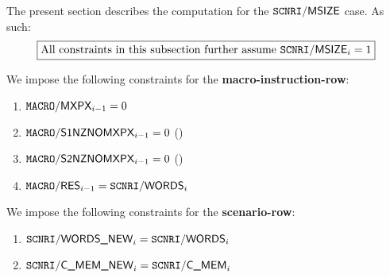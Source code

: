 

The present section describes the computation for the $\texttt{SCNRI}\textsf{/}{\textsf{MSIZE}}$ case. As such:
\[
	\boxed{\text{All constraints in this subsection further assume } \texttt{SCNRI}\textsf{/}{\textsf{MSIZE}}_{i} = 1}
\]

We impose the following constraints for the \textbf{macro-instruction-row}:

\begin{enumerate}
	\item $\texttt{MACRO}\textsf{/}{\textsf{MXPX}}_{i-1} = 0$
    \item $\texttt{MACRO}\textsf{/}{\textsf{S1NZNOMXPX}}_{i-1} = 0$ \quad (\sanityCheck)
    \item $\texttt{MACRO}\textsf{/}{\textsf{S2NZNOMXPX}}_{i-1} = 0$ \quad (\sanityCheck)
    \item $\texttt{MACRO}\textsf{/}{\textsf{RES}}_{i-1} = \texttt{SCNRI}\textsf{/}{\textsf{WORDS}}_{i}$
\end{enumerate}

We impose the following constraints for the \textbf{scenario-row}:

\begin{enumerate}
	\item $\texttt{SCNRI}\textsf{/}{\textsf{WORDS\_NEW}}_{i} = \texttt{SCNRI}\textsf{/}{\textsf{WORDS}}_{i}$
	\item $\texttt{SCNRI}\textsf{/}{\textsf{C\_MEM\_NEW}}_{i}  =  \texttt{SCNRI}\textsf{/}{\textsf{C\_MEM}}_{i}$
\end{enumerate}